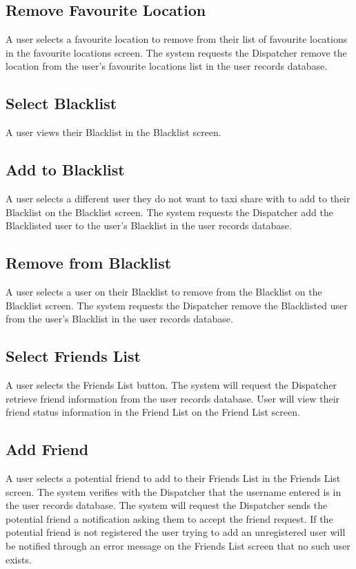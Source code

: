 \documentclass[english]{article}
\begin{document}
\subsection{Remove Favourite Location}
A user selects a favourite location to remove from their list of favourite locations in the favourite locations screen. The system requests the Dispatcher remove the location from the user's favourite locations list in the user records database. 
\subsection{Select Blacklist}
A user views their Blacklist in the Blacklist screen.
\subsection{Add to Blacklist}
A user selects a different user they do not want to taxi share with to add to their Blacklist on the Blacklist screen. The system requests the Dispatcher add the Blacklisted user to the user's Blacklist in the user records database. 
\subsection{Remove from Blacklist}
A user selects a user on their Blacklist to remove from the Blacklist on the Blacklist screen. The system requests the Dispatcher remove the Blacklisted user from the user's Blacklist in the user records database. 
\subsection{Select Friends List}
A user selects the Friends List button. The system will request the Dispatcher retrieve friend information from the user records database. User will view their friend status information in the Friend List on the Friend List screen. 
\subsection{Add Friend}
A user selects a potential friend to add to their Friends List in the Friends List screen. The system verifies with the Dispatcher that the username entered is in the user records database. The system will request the Dispatcher sends the potential friend a notification asking them to accept the friend request. If the potential friend is not registered the user trying to add an unregistered user will be notified through an error message on the Friends List screen that no such user exists. 
\end{document}
